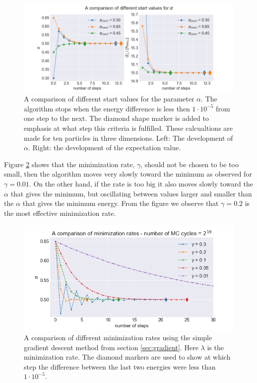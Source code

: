 \begin{figure}[H]
\center
\includegraphics[width=\linewidth]{../Results/gradient_descent_starts}\caption{A comparison of different start values for the parameter $\alpha$. The algorithm stops when the energy difference is less then $1\cdot10^{-5}$ from one step to the next. The diamond shape marker is added to emphasis at what step this criteria is fulfilled. These calcualtions are made for ten particles in three dimensions. Left: The development of $\alpha$. Right: the development of the expectation value.}\label{fig:gradient_descent_starts}
\end{figure}

Figure \ref{fig:gradient_descent_rates} shows that the minimization rate, $\gamma$, should not be chosen to be too small, then the algorithm moves very slowly toward the minimum as observed for $\gamma= 0.01$. On the other hand, if the rate is too big it also moves slowly toward the $\alpha$ that gives the minimum, but oscillating between values larger and smaller than the $\alpha$ that gives the minimum energy. From the figure we observe that $\gamma = 0.2$ is the most effective minimization rate.

\begin{figure}[H]
\center
\includegraphics[width=0.8\linewidth]{../Results/gradient_minimization_rate}\caption{A comparison of different minimization rates using the simple gradient descent method from section \ref{sec:gradient}. Here $\lambda$ is the minimization rate. The diamond markers are used to show at which step the difference between the last two energies were less than $1\cdot 10^{-5}$.} \label{fig:gradient_descent_rates}
\end{figure}

